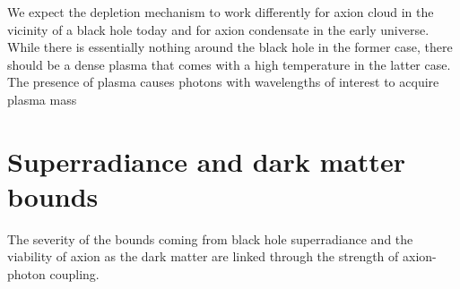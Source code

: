 \documentclass[%
 reprint,
 amsmath,amssymb,
 aps,nofootinbib
]{revtex4-1}
\begin{document}
We expect the depletion mechanism to work differently for axion cloud in the vicinity of a black hole today and for axion condensate in the early universe. While there is essentially nothing around the black hole in the former case, there should be a dense plasma that comes with a high temperature in the latter case. The presence of plasma causes photons with wavelengths of interest to acquire plasma mass








\section{Superradiance and dark matter bounds}
The severity of the bounds coming from black hole superradiance and the viability of axion as the dark matter are linked through the strength of axion-photon coupling.










\newpage


% 
\end{document}
